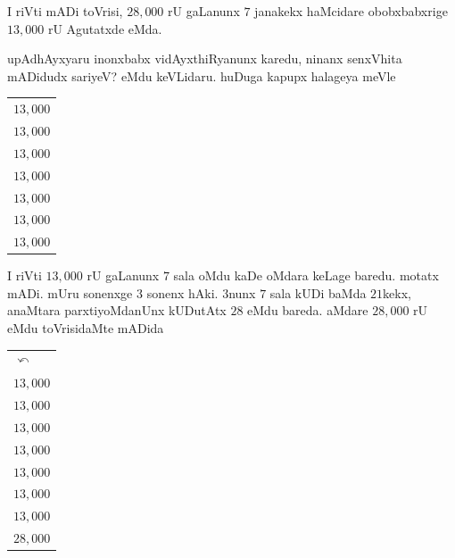 \medskip

I riVti mADi toVrisi, $28,000$ rU gaLanunx $7$ janakekx haMcidare obobxbabxrige $13,000$ rU Agutatxde eMda.

\bigskip

\noindent
\begin{minipage}[c]{5.5cm}
\qquad upAdhAyxyaru inonxbabx vidAyxthiRyanunx karedu, ninanx senxVhita mADidudx sariyeV? eMdu keVLidaru. huDuga kapupx halageya meVle
\end{minipage}
\quad
\begin{minipage}[c]{4cm}
\begin{center}
\begin{tabular}{l}
$13,000$\\
$13,000$\\
$13,000$\\
$13,000$\\
$13,000$\\
$13,000$\\
$13,000$\\
\hline
\end{tabular}
\end{center}
\end{minipage}

\noindent
\begin{minipage}[c]{5.5cm}
\qquad I riVti $13,000$ rU gaLanunx $7$ sala oMdu kaDe oMdara keLage baredu. motatx mADi. mUru sonenxge $3$ sonenx hAki. $3$nunx $7$ sala kUDi baMda $21$kekx, anaMtara parxtiyoMdanUnx kUDutAtx $28$ eMdu bareda. aMdare $28,000$ rU eMdu toVrisidaMte mADida
\end{minipage}
\quad
\begin{minipage}[c]{4cm}
\begin{center}
\begin{tabular}{l}
$\curvearrowleft$\\
$13,000$\\
$13,000$\\
$13,000$\\
$13,000$\\
$13,000$\\
$13,000$\\
$13,000$\\
\hline
$28,000$
\end{tabular}
\end{center}
\end{minipage}

\smallskip

